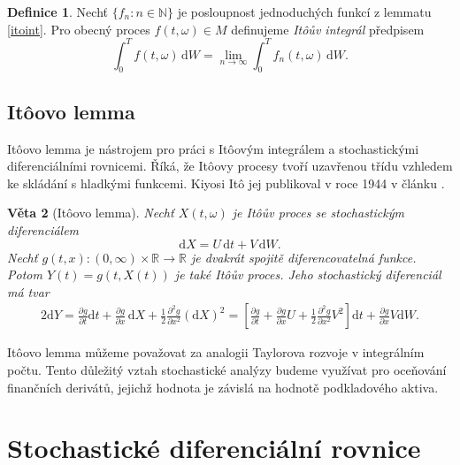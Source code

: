 \documentclass[a4paper,12pt]{report}
\newtheorem{veta}{Věta}
\theoremstyle{definition} \newtheorem{definice}[veta]{Definice}
\theoremstyle{remark}
\begin{document}
\begin{definice}
Nechť $\{f_n:n\in\mathbb N\}$ je posloupnost jednoduchých funkcí z lemmatu \ref{itoint}.
Pro obecný proces $f(t,\omega)\in M$ definujeme \textit{It\^oův integrál} předpisem
$$\int_0^Tf(t,\omega)\,\mathrm{d}W=\lim_{n\to\infty}\int_0^Tf_n(t,\omega)\,\mathrm{d}W.$$
\end{definice}

\subsection{It\^oovo lemma}
It\^oovo lemma je nástrojem pro práci s It\^oovým integrálem a stochastickými diferenciálními rovnicemi.
Říká, že It\^oovy procesy tvoří uzavřenou třídu vzhledem ke skládání s hladkými funkcemi.
Kiyosi It\^o jej publikoval v roce 1944 v článku \cite{ito1944}.
\begin{veta}[It\^oovo lemma]
Nechť $X(t,\omega)$ je It\^oův proces se stochastickým diferenciálem
$$\mathrm{d}X=U\,\mathrm{d}t+V\,\mathrm{d}W.$$
Nechť $g(t,x):(0,\infty)\times\mathbb R\to\mathbb R$ je dvakrát spojitě diferencovatelná funkce.
Potom $Y(t)=g(t,X(t))$ je také It\^oův proces.
Jeho stochastický diferenciál má tvar
\begin{alignat*}{2}
\mathrm{d}Y=\frac{\partial g}{\partial t}\mathrm{d}t+\frac{\partial g}{\partial x}\,\mathrm{d}X+\frac12\frac{\partial^2 g}{\partial x^2}(\mathrm{d}X)^2=\left[\frac{\partial g}{\partial t}+\frac{\partial g}{\partial x}U+\frac12\frac{\partial^2 g}{\partial x^2}V^2\right]\mathrm{d}t+\frac{\partial g}{\partial x}V\mathrm{d}W.
\end{alignat*}
\end{veta}

It\^oovo lemma můžeme považovat za analogii Taylorova rozvoje v integrálním počtu.
Tento důležitý vztah stochastické analýzy budeme využívat pro oceňování finančních derivátů, jejichž hodnota je závislá na hodnotě podkladového aktiva.



\section{Stochastické diferenciální rovnice}
\end{document}
